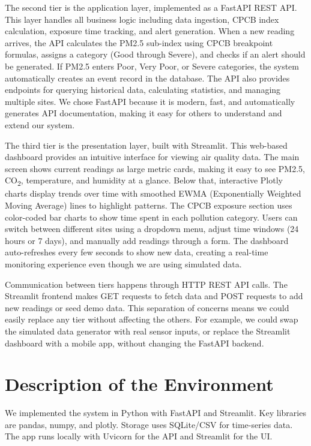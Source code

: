 \documentclass[12pt]{report}
\begin{document}
The second tier is the application layer, implemented as a FastAPI REST API. This layer handles all business logic including data ingestion, CPCB index calculation, exposure time tracking, and alert generation. When a new reading arrives, the API calculates the PM2.5 sub-index using CPCB breakpoint formulas, assigns a category (Good through Severe), and checks if an alert should be generated. If PM2.5 enters Poor, Very Poor, or Severe categories, the system automatically creates an event record in the database. The API also provides endpoints for querying historical data, calculating statistics, and managing multiple sites. We chose FastAPI because it is modern, fast, and automatically generates API documentation, making it easy for others to understand and extend our system.

The third tier is the presentation layer, built with Streamlit. This web-based dashboard provides an intuitive interface for viewing air quality data. The main screen shows current readings as large metric cards, making it easy to see PM2.5, CO\textsubscript{2}, temperature, and humidity at a glance. Below that, interactive Plotly charts display trends over time with smoothed EWMA (Exponentially Weighted Moving Average) lines to highlight patterns. The CPCB exposure section uses color-coded bar charts to show time spent in each pollution category. Users can switch between different sites using a dropdown menu, adjust time windows (24 hours or 7 days), and manually add readings through a form. The dashboard auto-refreshes every few seconds to show new data, creating a real-time monitoring experience even though we are using simulated data.

Communication between tiers happens through HTTP REST API calls. The Streamlit frontend makes GET requests to fetch data and POST requests to add new readings or seed demo data. This separation of concerns means we could easily replace any tier without affecting the others. For example, we could swap the simulated data generator with real sensor inputs, or replace the Streamlit dashboard with a mobile app, without changing the FastAPI backend.

\section{Description of the Environment}
We implemented the system in Python with FastAPI and Streamlit. Key libraries are pandas, numpy, and plotly. Storage uses SQLite/CSV for time-series data. The app runs locally with Uvicorn for the API and Streamlit for the UI.
\end{document}
